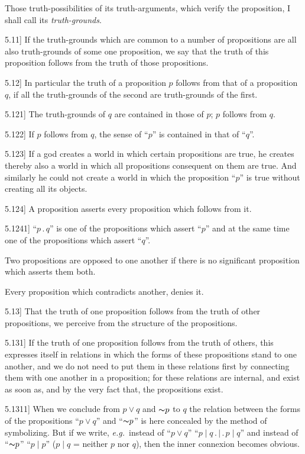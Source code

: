 \documentclass[12pt,oneside]{book}[2007/10/19]
\newcommand{\PropositionE}[2]{%
  \item[\phantomsection\label{PropE:#1}\PropGRef{#1}] #2%
}
\newcommand{\PropGRef}[1]{\hyperref[PropG:#1]{#1}}
\newcommand{\Not}[1]{\mathord{\thicksim} #1}
\newcommand{\DotOp}{\mathbin{.}}
\newcommand{\BarOp}{\mathbin{|}}
\newcommand{\exempliGratia}{\textit{e.g.}}
\begin{document}
\begin{propositions}
{Those truth-possibilities of its truth-arguments,
which verify the proposition, I shall call its \emph{truth-grounds}.}


\PropositionE{5.11}
{If the truth-grounds which are common to a
number of propositions are all also truth-grounds
of some one proposition, we say that the truth of
this proposition follows from the truth of those
propositions.}


\PropositionE{5.12}
{In particular the truth of a proposition $p$ follows
from that of a proposition $q$, if all the truth-grounds
of the second are truth-grounds of the
first.}


\PropositionE{5.121}
{The truth-grounds of $q$ are contained in those
of $p$; $p$ follows from $q$.}


\PropositionE{5.122}
{If $p$ follows from $q$, the sense of ``$p$'' is contained
in that of ``$q$''.}


\PropositionE{5.123}
{If a god creates a world in which certain propositions
are true, he creates thereby also a world
in which all propositions consequent on them are
true. And similarly he could not create a world
in which the proposition ``$p$'' is true without
creating all its objects.}


\PropositionE{5.124}
{A proposition asserts every proposition which
follows from it.}


\PropositionE{5.1241}
{``$p \DotOp q$'' is one of the propositions which assert
``$p$'' and at the same time one of the propositions
which assert ``$q$''.

Two propositions are opposed to one another
if there is no significant proposition which asserts
them both.

Every proposition which contradicts another,
denies it.}


\PropositionE{5.13}
{That the truth of one proposition follows from
the truth of other propositions, we perceive from
the structure of the propositions.}


\PropositionE{5.131}
{If the truth of one proposition follows from the
truth of others, this expresses itself in relations in
which the forms of these propositions stand to one
another, and we do not need to put them in these
relations first by connecting them with one another
in a proposition; for these relations are internal,
and exist as soon as, and by the very fact that,
the propositions exist.}


\PropositionE{5.1311}
{When we conclude from $p \lor q$ and $\Not{p}$ to $q$ the
relation between the forms of the propositions
``$p \lor q$'' and ``$\Not{p}$'' is here concealed by the method
of symbolizing. But if we write, \exempliGratia\ instead of
``$p \lor q$'' ``$p \BarOp q \DotOp \BarOp \DotOp p \BarOp q$'' and instead of ``$\Not{p}$''
``$p \BarOp p$'' ($p \BarOp q$ = neither $p$ nor $q$), then the inner
connexion becomes obvious.

}
\end{propositions}
\end{document}
